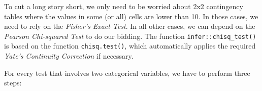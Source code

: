 \documentclass[
  letterpaper,
]{krantz}
\begin{document}
\begin{table}

\caption{\label{tbl-statistical-tests-unpaired-cat-variables}Statistical
tests to compare two unpaired categorical variables. Effect sizes are
computed using the \texttt{effectsize} package}


\end{table}%

To cut a long story short, we only need to be worried about 2x2
contingency tables where the values in some (or all) cells are lower
than 10. In those cases, we need to rely on the \emph{Fisher's Exact
Test}. In all other cases, we can depend on the \emph{Pearson
Chi-squared Test} to do our bidding. The function
\texttt{infer::chisq\_test()} is based on the function
\texttt{chisq.test()}, which automatically applies the required
\emph{Yate's Continuity Correction} if necessary.

For every test that involves two categorical variables, we have to
perform three steps:
\end{document}
